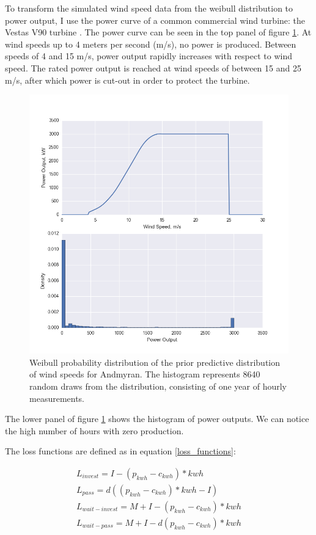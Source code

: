 \documentclass[11pt]{article}
\begin{document}
To transform the simulated wind speed data from the weibull distribution to power output, I use the power curve of a common commercial wind turbine: the Vestas V90 turbine \citep{vestas_v90}. The power curve can be seen in the top panel of figure \ref{power_output}. At wind speeds up to 4 meters per second (m/s), no power is produced. Between speeds of 4 and 15 m/s, power output rapidly increases with respect to wind speed. The rated power output is reached at wind speeds of between 15 and 25 m/s, after which power is cut-out in order to protect the turbine. 

\begin{figure}
	\centering
	\includegraphics[width=.8\textwidth]{figures/power_output.png}
	\caption{Weibull probability distribution of the prior predictive distribution of wind speeds for Andmyran. The histogram represents 8640 random draws from the distribution, consisting of one year of hourly measurements.}
	\label{power_output}
\end{figure}

The lower panel of figure \ref{power_output} shows the histogram of power outputs. We can notice the high number of hours with zero production.

The loss functions are defined as in equation \ref{loss_functions}:

\begin{align}
L_{invest} = I - (p_{kwh} - c_{kwh})*kwh\\
L_{pass} = d((p_{kwh} - c_{kwh})*kwh-I)\\
L_{wait-invest} = M + I - (p_{kwh} - c_{kwh})*kwh\\
L_{wait-pass} = M + I - d(p_{kwh} - c_{kwh})*kwh
\label{loss_functions}
\end{align}
\end{document}
